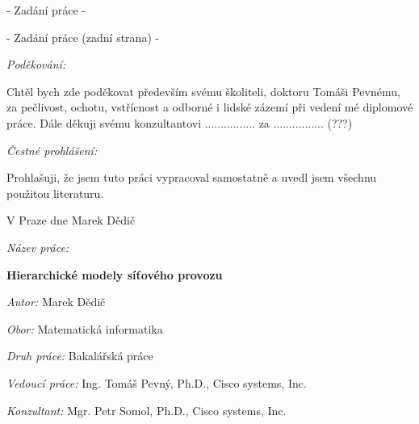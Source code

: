 \documentclass[a4paper,11pt]{book}
\begin{document}
\newpage

\null\newpage

\null\vfill
\begin{center}
	- Zadání práce -
\par\end{center}
\vfill

\newpage

\null\vfill
\begin{center}
	- Zadání práce (zadní strana) -
\par\end{center}
\vfill

\newpage

\noindent \textit{\Large Poděkování:}

\noindent Chtěl bych zde poděkovat především svému školiteli, doktoru Tomáši Pevnému,
za pečlivost, ochotu, vstřícnost a odborné i lidské zázemí při vedení
mé diplomové práce. Dále děkuji svému konzultantovi ................
za ................ (???)

\vfill

\noindent \textit{\Large Čestné prohlášení:}

\noindent Prohlašuji, že jsem tuto práci vypracoval samostatně a uvedl
jsem všechnu použitou literaturu.

\bigskip

\noindent V Praze dne \documentdate\hfill Marek Dědič

\vspace{2cm}

\newpage

\null\newpage

\begin{onehalfspace}
	\noindent \textit{Název práce:}

	\noindent \textbf{Hierarchické modely síťového provozu}
\end{onehalfspace}

\bigskip

\noindent \textit{Autor:} Marek Dědič

\bigskip

\noindent \textit{Obor:} Matematická informatika

\bigskip

\noindent \textit{Druh práce:} Bakalářská práce

\bigskip

\noindent \textit{Vedoucí práce:} Ing. Tomáš Pevný, Ph.D., Cisco systems, Inc.

\bigskip

\noindent \textit{Konzultant:} Mgr. Petr Somol, Ph.D., Cisco systems, Inc.
\end{document}
